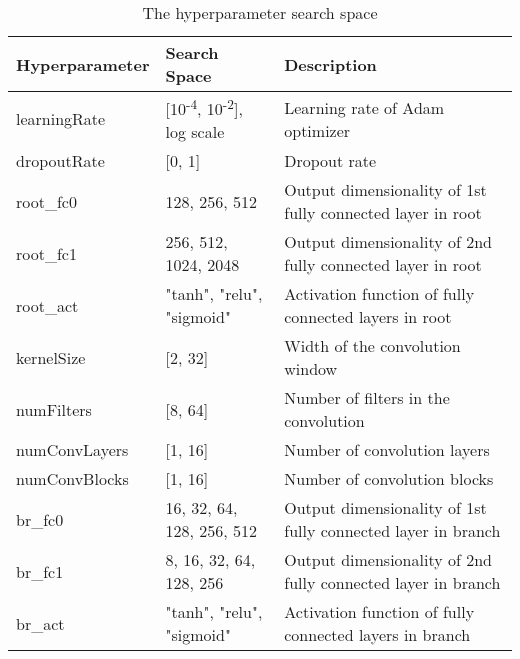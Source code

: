 \begin{table}[h]
  \centering
  \begin{tabular}{lll}
    \hline
    \textbf{Hyperparameter} & \textbf{Search Space}                             & \textbf{Description}            \\
    \hline
    learningRate  & [10\textsuperscript{-4}, 10\textsuperscript{-2}], log scale & Learning rate of Adam optimizer \\
    dropoutRate   & [0, 1]                    & Dropout rate                                                      \\
    root\_fc0     & 128, 256, 512             & Output dimensionality of 1st fully connected layer in root        \\
    root\_fc1     & 256, 512, 1024, 2048      & Output dimensionality of 2nd fully connected layer in root        \\
    root\_act     & "tanh", "relu", "sigmoid" & Activation function of fully connected layers in root             \\
    kernelSize    & [2, 32]                   & Width of the convolution window                                   \\
    numFilters    & [8, 64]                   & Number of filters in the convolution                              \\
    numConvLayers & [1, 16]                   & Number of convolution layers                                      \\
    numConvBlocks & [1, 16]                   & Number of convolution blocks                                      \\
    br\_fc0       & 16, 32, 64, 128, 256, 512 & Output dimensionality of 1st fully connected layer in branch      \\
    br\_fc1       & 8, 16, 32, 64, 128, 256   & Output dimensionality of 2nd fully connected layer in branch      \\
    br\_act       & "tanh", "relu", "sigmoid" & Activation function of fully connected layers in branch           \\
    \hline
  \end{tabular}
  \caption{The hyperparameter search space}
  \label{si_table16}
\end{table}



